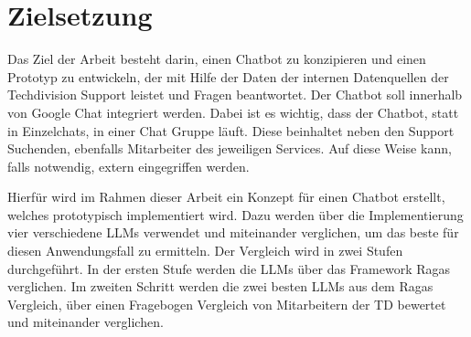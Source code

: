 \section{Zielsetzung}
\label{s:intro:goal}

Das Ziel der Arbeit besteht darin, einen Chatbot zu konzipieren und einen Prototyp zu entwickeln, der mit Hilfe der Daten 
der internen Datenquellen der Techdivision Support leistet und Fragen beantwortet. Der Chatbot soll 
innerhalb von Google Chat integriert werden. Dabei ist es wichtig, dass der Chatbot, statt in Einzelchats, in einer Chat 
Gruppe läuft. Diese beinhaltet neben den Support Suchenden, ebenfalls Mitarbeiter des jeweiligen Services. Auf diese Weise 
kann, falls notwendig, extern eingegriffen werden. \par
Hierfür wird im Rahmen dieser Arbeit ein Konzept für einen Chatbot erstellt, 
welches prototypisch implementiert wird. Dazu werden über die Implementierung vier verschiedene LLMs 
verwendet und miteinander verglichen, um das beste für diesen Anwendungsfall zu ermitteln. 
Der Vergleich wird in zwei Stufen durchgeführt. In der ersten Stufe werden 
die LLMs über das Framework Ragas verglichen. Im zweiten Schritt werden
die zwei besten LLMs aus dem Ragas Vergleich, über einen 
Fragebogen Vergleich von Mitarbeitern der TD bewertet und miteinander verglichen.